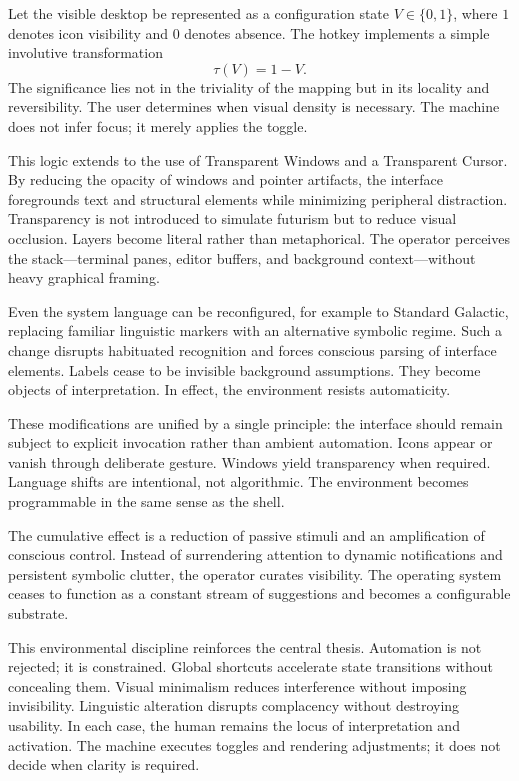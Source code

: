 \documentclass[11pt]{article}
\begin{document}
Let the visible desktop be represented as a configuration state \(V \in \{0,1\}\), where \(1\) denotes icon visibility and \(0\) denotes absence. The hotkey implements a simple involutive transformation
\[
\tau(V) = 1 - V.
\]
The significance lies not in the triviality of the mapping but in its locality and reversibility. The user determines when visual density is necessary. The machine does not infer focus; it merely applies the toggle.

This logic extends to the use of Transparent Windows and a Transparent Cursor. By reducing the opacity of windows and pointer artifacts, the interface foregrounds text and structural elements while minimizing peripheral distraction. Transparency is not introduced to simulate futurism but to reduce visual occlusion. Layers become literal rather than metaphorical. The operator perceives the stack—terminal panes, editor buffers, and background context—without heavy graphical framing.

Even the system language can be reconfigured, for example to Standard Galactic, replacing familiar linguistic markers with an alternative symbolic regime. Such a change disrupts habituated recognition and forces conscious parsing of interface elements. Labels cease to be invisible background assumptions. They become objects of interpretation. In effect, the environment resists automaticity.

These modifications are unified by a single principle: the interface should remain subject to explicit invocation rather than ambient automation. Icons appear or vanish through deliberate gesture. Windows yield transparency when required. Language shifts are intentional, not algorithmic. The environment becomes programmable in the same sense as the shell.

The cumulative effect is a reduction of passive stimuli and an amplification of conscious control. Instead of surrendering attention to dynamic notifications and persistent symbolic clutter, the operator curates visibility. The operating system ceases to function as a constant stream of suggestions and becomes a configurable substrate.

This environmental discipline reinforces the central thesis. Automation is not rejected; it is constrained. Global shortcuts accelerate state transitions without concealing them. Visual minimalism reduces interference without imposing invisibility. Linguistic alteration disrupts complacency without destroying usability. In each case, the human remains the locus of interpretation and activation. The machine executes toggles and rendering adjustments; it does not decide when clarity is required.
\end{document}
